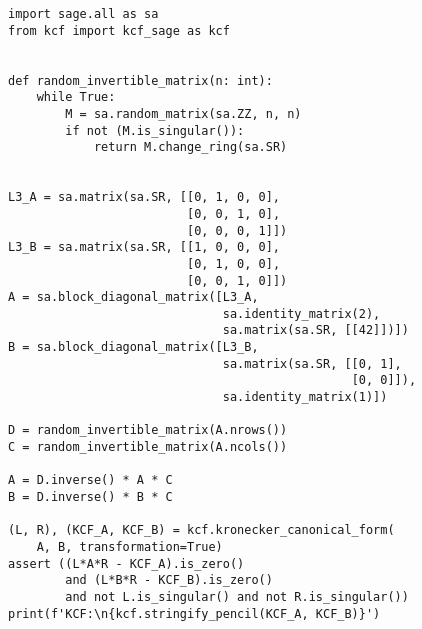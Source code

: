 \begin{verbatim}
import sage.all as sa
from kcf import kcf_sage as kcf


def random_invertible_matrix(n: int):
    while True:
        M = sa.random_matrix(sa.ZZ, n, n)
        if not (M.is_singular()):
            return M.change_ring(sa.SR)


L3_A = sa.matrix(sa.SR, [[0, 1, 0, 0],
                         [0, 0, 1, 0],
                         [0, 0, 0, 1]])
L3_B = sa.matrix(sa.SR, [[1, 0, 0, 0],
                         [0, 1, 0, 0],
                         [0, 0, 1, 0]])
A = sa.block_diagonal_matrix([L3_A,
                              sa.identity_matrix(2),
                              sa.matrix(sa.SR, [[42]])])
B = sa.block_diagonal_matrix([L3_B,
                              sa.matrix(sa.SR, [[0, 1],
                                                [0, 0]]),
                              sa.identity_matrix(1)])

D = random_invertible_matrix(A.nrows())
C = random_invertible_matrix(A.ncols())

A = D.inverse() * A * C
B = D.inverse() * B * C

(L, R), (KCF_A, KCF_B) = kcf.kronecker_canonical_form(
    A, B, transformation=True)
assert ((L*A*R - KCF_A).is_zero()
        and (L*B*R - KCF_B).is_zero()
        and not L.is_singular() and not R.is_singular())
print(f'KCF:\n{kcf.stringify_pencil(KCF_A, KCF_B)}')
\end{verbatim}